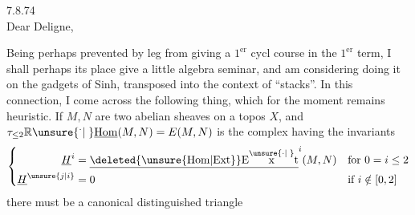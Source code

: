 
  7.8.74\\
Dear Deligne,\\


Being perhaps prevented by  leg from giving a $1^{\mathrm{er}}$ cycl course in the $1^{\mathrm{er}}$ term, I shall perhaps  its place give a little algebra seminar, and am considering doing it on the gadgets of  Sinh,  transposed into the context of ``stacks''. In this connection, I come across the following thing, which for the moment remains heuristic. If $M,N$ are two abelian sheaves on a topos $X$, and $\tau_{\leq 2}\mathbb{R}\unsure{{}^{\cdot}|\phantom{{}^{\cdot}}}\underline{\mathrm{Hom}}(M,N)=E(M,N)$ is the complex having the invariants
\[
\left\{\begin{aligned}
\underline{H}^{i}&=\underline{\deleted{\unsure{\mathrm{Hom}|\mathrm{Ext}}}\mathrm{E}\overset{\unsure{\cdot|\phantom{\cdot}}}{\mathrm{x}}\mathrm{t}}^{i}(M,N) &&\text{for }0=i\leq 2\\
\underline{H}^{\unsure{j|i}}&=0 &&\text{if }i\notin[0,2]
\end{aligned}\right.
\]
there must be a canonical distinguished triangle

